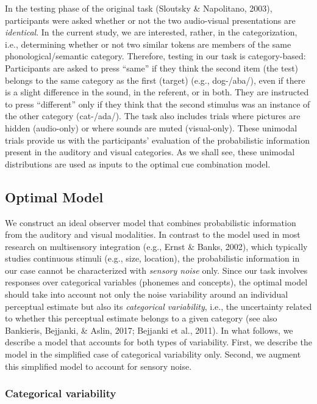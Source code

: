 \documentclass[english,,man,floatsintext]{apa6}
\theoremstyle{definition}
\theoremstyle{definition}
\theoremstyle{definition}
\theoremstyle{remark}
\begin{document}
In the testing phase of the original task (Sloutsky \& Napolitano,
2003), participants were asked whether or not the two audio-visual
presentations are \emph{identical}. In the current study, we are
interested, rather, in the categorization, i.e., determining whether or
not two similar tokens are members of the same phonological/semantic
category. Therefore, testing in our task is category-based: Participants
are asked to press \enquote{same} if they think the second item (the
test) belongs to the same category as the first (target) (e.g.,
dog-/aba/), even if there is a slight difference in the sound, in the
referent, or in both. They are instructed to press \enquote{different}
only if they think that the second stimulus was an instance of the other
category (cat-/ada/). The task also includes trials where pictures are
hidden (audio-only) or where sounds are muted (visual-only). These
unimodal trials provide us with the participants' evaluation of the
probabilistic information present in the auditory and visual categories.
As we shall see, these unimodal distributions are used as inputs to the
optimal cue combination model.

\subsection{Optimal Model}\label{optimal-model}

We construct an ideal observer model that combines probabilistic
information from the auditory and visual modalities. In contrast to the
model used in most research on multisensory integration (e.g., Ernst \&
Banks, 2002), which typically studies continuous stimuli (e.g., size,
location), the probabilistic information in our case cannot be
characterized with \emph{sensory noise} only. Since our task involves
responses over categorical variables (phonemes and concepts), the
optimal model should take into account not only the noise variability
around an individual perceptual estimate but also its \emph{categorical
variability}, i.e., the uncertainty related to whether this perceptual
estimate belongs to a given category (see also Bankieris, Bejjanki, \&
Aslin, 2017; Bejjanki et al., 2011). In what follows, we describe a
model that accounts for both types of variability. First, we describe
the model in the simplified case of categorical variability only.
Second, we augment this simplified model to account for sensory noise.

\subsubsection{Categorical variability}\label{categorical-variability}
\end{document}

